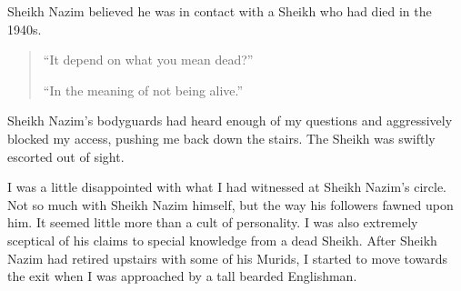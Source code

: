 \documentclass[12pt]{memoir}
\newcommand{\cor}[2]{#2} %
\begin{document}
Sheikh Nazim believed he was in contact with a Sheikh
who had died in the 1940s.

\begin{quote}
“It depend on what you mean dead?”

“In the meaning of not being alive.”
\end{quote}

Sheikh Nazim’s bodyguards had heard enough of my questions
and aggressively blocked my access, pushing me back down the stairs.
The Sheikh was swiftly escorted out of sight.

I was a little disappointed
with what I had witnessed at Sheikh Nazim’s circle.
Not so much with Sheikh Nazim himself,
but the way his followers fawned upon him.
It seemed little more than a cult of personality.
I was also extremely \cor{skeptical}{sceptical} of his claims
to special knowledge from a dead Sheikh.
After Sheikh Nazim had retired upstairs with some of his Murids,
I started to move towards the exit
when I was approached by a tall bearded Englishman.
\end{document}
